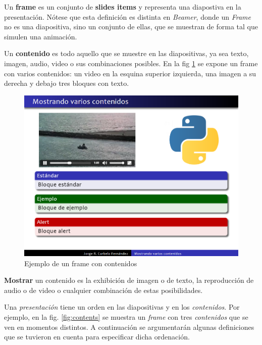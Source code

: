  		\begin{definition}
 		\label{def:frame}
			Un \textbf{frame} es un conjunto de \textbf{slides items} y representa una diapostiva en la presentación. Nótese que esta definición es distinta en \textit{Beamer}, donde un \textit{Frame} no es una diapositiva, sino un conjunto de ellas, que se muestran de forma tal que simulen una animación.
 		\end{definition}		

		\begin{definition}
		\label{def:content}
			Un \textbf{contenido} es todo aquello que se muestre en las diapositivas, ya sea texto, imagen, audio, video o sus combinaciones posibles. En la fig \ref{fig:frame_video_image} se expone un frame con varios contenidos: un video en la esquina superior izquierda, una imagen a su derecha y debajo tres bloques con texto.
		\end{definition}
 		\begin{figure}[tb]
 			\centering
 			\includegraphics[width=12cm]{img/frame-video-image}
 			\caption{Ejemplo de un frame con contenidos}
 			\label{fig:frame_video_image}
 		\end{figure} 		

		\begin{definition}
		\label{def:show}
			\textbf{Mostrar} un contenido es la exhibición de imagen o de texto, la reproducción de audio o de video o cualquier combinación de estas posibilidades.
		\end{definition} 		

		Una \textit{presentación} tiene un orden en las diapositivas y en los \textit{contenidos}. Por ejemplo, en la fig. \ref{fig:contents} se muestra un \textit{frame} con tres \textit{contenidos} que se ven en momentos distintos. A continuación se argumentarán algunas definiciones que se tuvieron en cuenta para especificar dicha ordenación.

